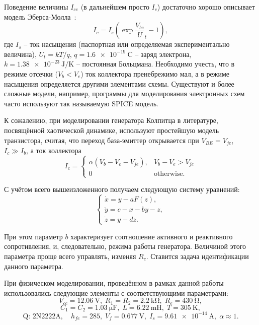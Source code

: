 Поведение величины $I_{ce}$ (в дальнейшем просто $I_c$) достаточно хорошо описывает модель
Эберса-Молла~\cite{horowitz}:
%
\begin{equation}
  I_c = I_s \left( \exp\frac{V_{be}}U_t{} - 1 \right),
  \label{atu:eq:ebers-moll}
\end{equation}
%
где
$I_s$ -- ток насыщения (паспортная или определяемая экспериментально величина),
$U_t=kT/q$,
$q = \SI{1.6e-19}{\coulomb}$ -- заряд электрона,
$k = \SI{1.38e-23}{\joule/\kelvin}$ -- постоянная Больцмана.
Необходимо учесть, что в режиме отсечки ($V_b < V_e$) ток коллектора пренебрежимо мал,
а в режиме насыщения определяется другими элементами схемы.
Существуют и более сложные модели, например,
программы для моделирования электронных схем часто используют так называемую SPICE модель.

К сожалению, при моделировании генератора Колпитца в литературе,
посвящённой хаотической динамике, используют
простейшую модель транзистора, считая, что переход
база-эмиттер открывается при $V_{BE} = V_{je}$, $ I_c \gg I_b$,
а ток коллектора
%
\begin{equation}
I_c =
  \begin{cases}
    \alpha ( V_b - V_e - V_{je} ), & V_b - V_e > V_{je} \\
    0                              & \text{otherwise}.
  \end{cases}
  \label{atu:eq:bjt_libear_model}
\end{equation}



С учётом всего вышеизложенного получаем следующую систему уравнений:
%
\begin{equation}
\label{atu:eq:colp}
\begin{cases}
  \dot{x} = y - a F(z), \\
  \dot{y} = c - x - by - z, \\
  \dot{z} = y - d z.
\end{cases}
\end{equation}

При этом параметр $b$ характеризует соотношение
активного и реактивного сопротивления,
и, следовательно, режима работы генератора.
Величиной этого параметра проще всего управлять,
изменяя $R_c$.
Ставится задача идентификации данного параметра.

При физическом моделировании, проведённом в рамках данной работы использовались следующие
элементы с соответствующими параметрами:
%
\[
  V_{cc} = \SI{12.06}{\volt},          \;
  R_1 = R_2 = \SI{2.2}{\kilo\ohm},     \;
  R_e = \SI{430}{\ohm},
\]
%
\[
  C_1 = C_2 = \SI{1.03}{\micro\farad}, \;
  L = \SI{6.22}{\milli\henry},         \;
  T = \SI{305}{\kelvin},
\]
%
\[
  \text{Q: 2N2222A}, \quad
  h_{fe}=285, \;
  V_f = \SI{0.677}{\volt}, \;
  I_s = \SI{9.61e-14}{\ampere}, \;
  \alpha \approx 1.
\]

